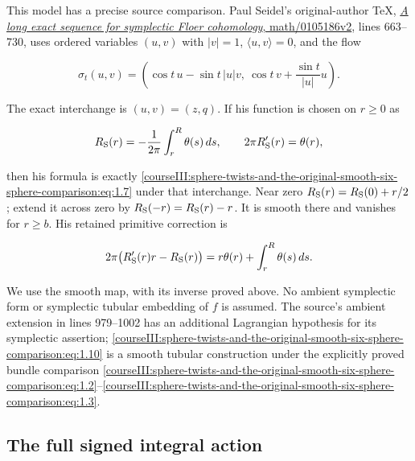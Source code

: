 This model has a precise source comparison. Paul Seidel's original-author TeX, \href{https://arxiv.org/abs/math/0105186v2}{\emph{A long exact sequence for symplectic Floer cohomology}, math/0105186v2}, lines 663--730, uses ordered variables \((u,v)\) with \(|v|=1\), \(\langle u,v\rangle=0\), and the flow

\begin{equation}
\sigma_t(u,v)=
  \left(\cos t\,u-\sin t\,|u|v,\
          \cos t\,v+\frac{\sin t}{|u|}u\right).
 \label{courseIII:sphere-twists-and-the-original-smooth-six-sphere-comparison:eq:1.12}
\end{equation}

The exact interchange is \((u,v)=(z,q)\). If his function is chosen on \(r\ge0\) as

\begin{equation}
R_{\rm S}(r)=-\frac1{2\pi}\int_r^R\theta(s)\,ds ,
 \qquad 2\pi R_{\rm S}'(r)=\theta(r),
 \label{courseIII:sphere-twists-and-the-original-smooth-six-sphere-comparison:eq:1.13}
\end{equation}

then his formula is exactly \eqref{courseIII:sphere-twists-and-the-original-smooth-six-sphere-comparison:eq:1.7} under that interchange. Near zero \(R_{\rm S}(r)=R_{\rm S}(0)+r/2\); extend it across zero by \(R_{\rm S}(-r)=R_{\rm S}(r)-r\). It is smooth there and vanishes for \(r\ge b\). His retained primitive correction is

\begin{equation}
2\pi\bigl(R_{\rm S}'(r)r-R_{\rm S}(r)\bigr)
              =r\theta(r)+\int_r^R\theta(s)\,ds .
 \label{courseIII:sphere-twists-and-the-original-smooth-six-sphere-comparison:eq:1.14}
\end{equation}

We use the smooth map, with its inverse proved above. No ambient symplectic form or symplectic tubular embedding of \(f\) is assumed. The source's ambient extension in lines 979--1002 has an additional Lagrangian hypothesis for its symplectic assertion; \eqref{courseIII:sphere-twists-and-the-original-smooth-six-sphere-comparison:eq:1.10} is a smooth tubular construction under the explicitly proved bundle comparison \eqref{courseIII:sphere-twists-and-the-original-smooth-six-sphere-comparison:eq:1.2}--\eqref{courseIII:sphere-twists-and-the-original-smooth-six-sphere-comparison:eq:1.3}.

\subsection{The full signed integral action}
\label{courseIII:sphere-twists-and-the-original-smooth-six-sphere-comparison:twist-signed-action}

